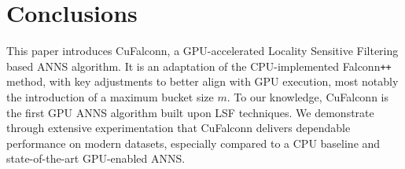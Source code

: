 \documentclass{article}
\newcommand{\cf}{CuFalconn\xspace}
\newcommand{\fpp}{Falconn\texttt{++}\xspace}
\begin{document}

    
    





\section{Conclusions}

This paper introduces \cf, a GPU-accelerated Locality Sensitive Filtering based ANNS algorithm. It is an adaptation of the CPU-implemented \fpp method, with key adjustments to better align with GPU execution, most notably the introduction of a maximum bucket size $m$. To our knowledge, \cf is the first GPU ANNS algorithm built upon LSF techniques. We demonstrate through extensive experimentation that \cf delivers dependable performance on modern datasets, especially compared to a CPU baseline and state-of-the-art GPU-enabled ANNS.
\end{document}
